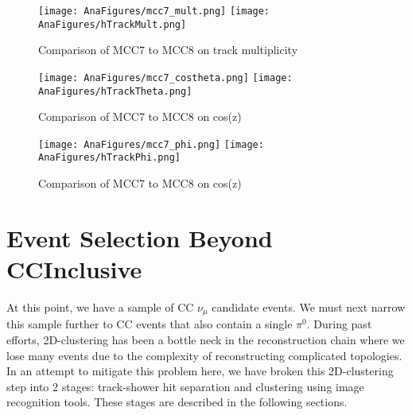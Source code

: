 \documentclass[12pt]{article}
\begin{document}
\begin{figure}[h!]
\centering
\texttt{[image: AnaFigures/mcc7\_mult.png]}
\hspace{1 mm}
\texttt{[image: AnaFigures/hTrackMult.png]}
\caption{Comparison of MCC7 to MCC8 on track multiplicity }
\label{fig:compare_mult}
\end{figure}

\begin{figure}[h!]
\centering
\texttt{[image: AnaFigures/mcc7\_costheta.png]}
\hspace{1 mm}
\texttt{[image: AnaFigures/hTrackTheta.png]}
\caption{Comparison of MCC7 to MCC8 on cos(z) }
\label{fig:compare_mult}
\end{figure}

\begin{figure}[h!]
\centering
\texttt{[image: AnaFigures/mcc7\_phi.png]}
\hspace{1 mm}
\texttt{[image: AnaFigures/hTrackPhi.png]}
\caption{Comparison of MCC7 to MCC8 on cos(z) }
\label{fig:compare_mult}
\end{figure}



\clearpage
\section{Event Selection Beyond CCInclusive}
At this point, we have a sample of CC $\nu_\mu$ candidate events. We must next narrow this sample further to CC events that also contain a single $\pi^0$. During past efforts, 2D-clustering has been a bottle neck in the reconstruction chain where we lose many events due to the complexity of reconstructing complicated topologies. In an attempt to mitigate this problem here, we have broken this 2D-clustering step into 2 stages: track-shower hit separation and clustering using image recognition tools. These stages are described in the following sections.
\end{document}
